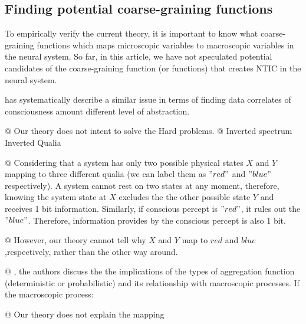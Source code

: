 \subsection{Finding potential coarse-graining functions}
To empirically verify the current theory, it is important to know what coarse-graining functions which maps microscopic variables to macroscopic variables in the neural system. So far, in this article, we have not speculated potential candidates of the coarse-graining function (or functions) that creates NTIC in the neural system. 

\cite{Gamez2016} has systematically describe a similar issue in terms of finding data correlates of consciousness amount different 
level of abstraction. 

    \begin{ants}
        @ Our theory does not intent to solve the Hard problems. 
        @ Inverted spectrum Inverted Qualia \citep{Shoemaker1982-SHOTIS, Block1990-BLOIE, Locke1979-LOCTCE-2}
        
        @ Considering that a system has only two possible physical states $X$ and $Y$ mapping to three different qualia (we can label them as $"red"$ and $"blue"$ respectively). A system cannot rest on two states at any moment, therefore, knowing the system state at $X$ excludes the the other possible state $Y$ and receives 1 bit information. Similarly, if conscious percept is $"red"$, it rules out the $"blue"$. Therefore, information provides by the conscious percept is also 1 bit. 
        
        @ However, our theory cannot tell why $X$ and $Y$ map to $red$ and $blue$ ,respectively, rather than the other way around. 
        
        @ \cite{PFANTE.2014}, the authors discuss the the implications of the types of aggregation function (deterministic or probabilistic) and its relationship with macroscopic processes. If the macroscopic process:  
        
        
        
        @ Our theory does not explain the mapping
    \end{ants}
